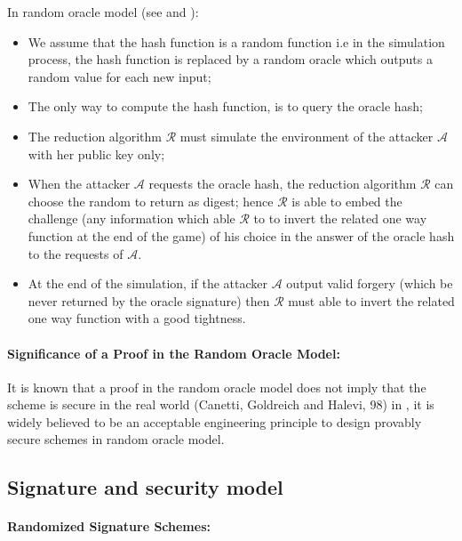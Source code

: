\documentclass[a4paper,11pt]{article}
\begin{document}
In random oracle model (see \cite{Bellare1} and \cite{Canetti}):
\begin{itemize}
\item We assume that the hash function is a random function i.e in the simulation process, the hash function is replaced by a random oracle which outputs a random value for each new input;
\item The only way to compute the hash function, is to query the oracle hash;
\item The reduction algorithm $\mathcal{R}$ must simulate the  environment of the attacker $\mathcal{A}$ with her public key only;
\item  When the attacker $\mathcal{A}$ requests the oracle hash,
 the reduction algorithm $\mathcal{R}$ can choose the random to return as digest; hence $\mathcal{R}$
is able to embed the challenge (any information which able $\mathcal{R}$ to to invert the related one way function at the end of the game)   of his choice in the answer of the oracle hash to the requests of  $\mathcal{A}$.
\item  At the end of the simulation, if the attacker $\mathcal{A}$ output valid
 forgery (which be never returned by the oracle signature) then $\mathcal{R}$
 must able to invert the related one way function with a good tightness.
\end{itemize}

\vspace{0.2cm}

\paragraph{Significance of a Proof in the Random Oracle Model:}

It is known that a proof in the random oracle model does not imply that the scheme is secure in the real
world (Canetti, Goldreich and Halevi,  98) in \cite{Canetti}, it is  widely believed to be an acceptable engineering principle to design provably secure schemes in random oracle model.

\subsection{Signature and security model}\label{sec:one:2}

\paragraph{Randomized Signature Schemes:}
\end{document}

